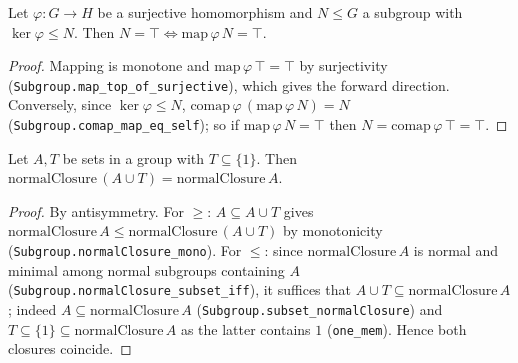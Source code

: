 \begin{lemma}
    \label{lem:top-iff-map-top}
    \leanok
    Let $\varphi : G \to H$ be a surjective homomorphism and $N \le G$ a subgroup
    with $\ker\varphi \le N$. Then
    $N = \top \iff \mathrm{map}\,\varphi\,N = \top$.
\end{lemma}
\begin{proof}
    Mapping is monotone and $\mathrm{map}\,\varphi\,\top = \top$ by surjectivity
    (\texttt{Subgroup.map\_top\_of\_surjective}), which gives the forward
    direction. Conversely, since $\ker\varphi \le N$,
    $\mathrm{comap}\,\varphi\,(\mathrm{map}\,\varphi\,N) = N$
    (\texttt{Subgroup.comap\_map\_eq\_self}); so if $\mathrm{map}\,\varphi\,N =
    \top$ then $N = \mathrm{comap}\,\varphi\,\top = \top$.
\end{proof}

\begin{lemma}
    \label{lem:normalClosure-insert-subset-one}
    Let $A, T$ be sets in a group with $T \subseteq \{1\}$. Then
    $\mathrm{normalClosure}\,(A \cup T) = \mathrm{normalClosure}\,A$.
\end{lemma}
\begin{proof}
    By antisymmetry. For $\ge$: $A \subseteq A \cup T$ gives
    $\mathrm{normalClosure}\,A \le \mathrm{normalClosure}\,(A \cup T)$ by
    monotonicity (\texttt{Subgroup.normalClosure\_mono}). For $\le$: since
    $\mathrm{normalClosure}\,A$ is normal and minimal among normal subgroups
    containing $A$ (\texttt{Subgroup.normalClosure\_subset\_iff}), it suffices that
    $A \cup T \subseteq \mathrm{normalClosure}\,A$; indeed $A \subseteq
    \mathrm{normalClosure}\,A$ (\texttt{Subgroup.subset\_normalClosure}) and
    $T \subseteq \{1\} \subseteq \mathrm{normalClosure}\,A$ as the latter contains
    $1$ (\texttt{one\_mem}). Hence both closures coincide.
\end{proof}

